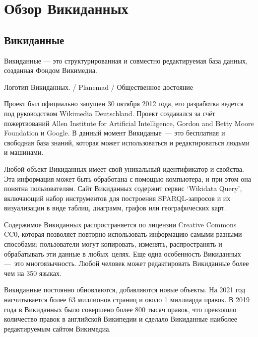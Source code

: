 \chapter{Обзор Викиданных}
\label{ch:ReviewAboutWD}

\section{Викиданные}
Викиданные — это структурированная и совместно редактируемая база данных, созданная Фондом Викимедиа\footnotemark {}. \begin{marginfigure}[0.0cm]
{
	\setlength{\fboxsep}{0pt}%
	\setlength{\fboxrule}{1pt}%
}
\caption
{Логотип Викиданных.  / Planemad / Общественное достояние
}
\label{fig:seyu}
\end{marginfigure}Проект был официально запущен 30 октября 2012 года, его разработка ведется под руководством Wikimedia Deutschland\cite{Wikipedia_review}. Проект создавался за счёт пожертвований Allen Institute for Artificial Intelligence, Gordon and Betty Moore Foundation и Google. В данный момент Викиданые — это бесплатная и свободная база знаний, которая может использоваться и редактироваться людьми и машинами\cite{Vrandecic}.

Любой объект Викиданных имеет свой уникальный идентификатор и свойства. Эта информация может быть обработана с помощью компьютера, и при этом она понятна пользователям. Сайт Викиданных содержит сервис ‘Wikidata Query’, включающий набор инструментов для построения SPARQL-запросов и их визуализации в виде таблиц, диаграмм, графов или географических карт.

Содержимое Викиданных распространяется по лицензии Creative Commons CC0, которая позволяет повторно использовать информацию самыми разными способами: пользователи могут копировать, изменять, распространять и обрабатывать эти данные в любых целях. Еще одна особенность Викиданных --- это многоязычность. Любой человек может редактировать Викиданные более чем на 350 языках.

Викиданные постоянно обновляются, добавляются новые объекты. На 2021 год насчитывается более 63 миллионов страниц и около 1 миллиарда правок. В 2019 года в Викиданных было совершено более 800 тысяч правок, что превзошло количество правок в английской Википедии и сделало Викиданные наиболее редактируемым сайтом Викимедиа\footnotemark . 
